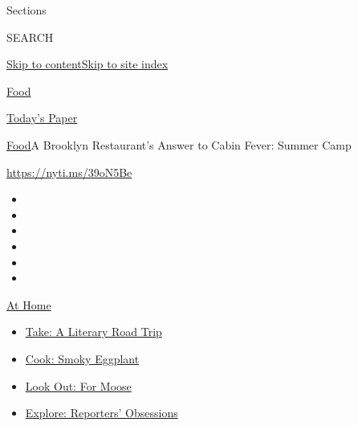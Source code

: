 Sections

SEARCH

\protect\hyperlink{site-content}{Skip to
content}\protect\hyperlink{site-index}{Skip to site index}

\href{https://www.nytimes3xbfgragh.onion/section/food}{Food}

\href{https://myaccount.nytimes3xbfgragh.onion/auth/login?response_type=cookie\&client_id=vi}{}

\href{https://www.nytimes3xbfgragh.onion/section/todayspaper}{Today's
Paper}

\href{/section/food}{Food}\textbar{}A Brooklyn Restaurant's Answer to
Cabin Fever: Summer Camp

\href{https://nyti.ms/39oN5Be}{https://nyti.ms/39oN5Be}

\begin{itemize}
\item
\item
\item
\item
\item
\item
\end{itemize}

\href{https://www.nytimes3xbfgragh.onion/spotlight/at-home?action=click\&pgtype=Article\&state=default\&region=TOP_BANNER\&context=at_home_menu}{At
Home}

\begin{itemize}
\tightlist
\item
  \href{https://www.nytimes3xbfgragh.onion/2020/07/28/books/time-for-a-literary-road-trip.html?action=click\&pgtype=Article\&state=default\&region=TOP_BANNER\&context=at_home_menu}{Take:
  A Literary Road Trip}
\item
  \href{https://www.nytimes3xbfgragh.onion/2020/07/29/magazine/bored-with-your-home-cooking-some-smoky-eggplant-will-fix-that.html?action=click\&pgtype=Article\&state=default\&region=TOP_BANNER\&context=at_home_menu}{Cook:
  Smoky Eggplant}
\item
  \href{https://www.nytimes3xbfgragh.onion/2020/07/27/travel/moose-michigan-isle-royale.html?action=click\&pgtype=Article\&state=default\&region=TOP_BANNER\&context=at_home_menu}{Look
  Out: For Moose}
\item
  \href{https://www.nytimes3xbfgragh.onion/interactive/2020/at-home/even-more-reporters-editors-diaries-lists-recommendations.html?action=click\&pgtype=Article\&state=default\&region=TOP_BANNER\&context=at_home_menu}{Explore:
  Reporters' Obsessions}
\end{itemize}

